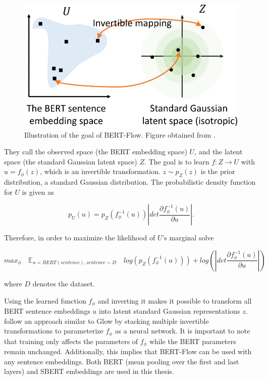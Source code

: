 \begin{figure}[h!]
\centering
\includegraphics[width = 0.8\linewidth]{figures/BERT-Flow.png}
\caption{Illustration of the goal of BERT-Flow. Figure obtained from \citet{li2020bertflow}.}
\label{fig:bert_flow}
\end{figure}

They call the observed space (the BERT embedding space) $U$, and the latent space (the standard Gaussian latent space) $Z$. The goal is to learn $f: Z \to U$ with $u=f_\phi (z)$, which is an invertible transformation. $z \sim p_Z (z)$ is the prior distribution, a standard Gaussian distribution. The probabilistic density function for $U$ is given as

\begin{equation}
    p_U (u)=p_Z (f^{-1}_\phi (u)) |det \frac{\partial f^{-1}_\phi (u)}{\partial u}|.
\end{equation}

Therefore, in order to maximize the likelihood of $U$'s marginal solve

\begin{equation}
    max_\phi \quad \mathbb{E}_{u=BERT(sentence), sentence \sim D} \quad log(p_Z (f^{-1}_\phi (u))) + log(|det \frac{\partial f^{-1}_\phi (u)}{\partial u}|)
\end{equation}

where $D$ denotes the dataset.

Using the learned function $f_\phi$ and inverting it makes it possible to transform all BERT sentence embeddings $u$ into latent standard Gaussian representations $z$. \citet{li2020bertflow} follow an approach similar to Glow \citep{kingma2018glow} by stacking multiple invertible transformations to parameterize $f_\phi$ as a neural network. It is important to note that training only affects the parameters of $f_\phi$ while the BERT parameters remain unchanged. Additionally, this implies that BERT-Flow can be used with any sentence embeddings. Both BERT (mean pooling over the first and last layers) and SBERT embeddings are used in this thesis.

